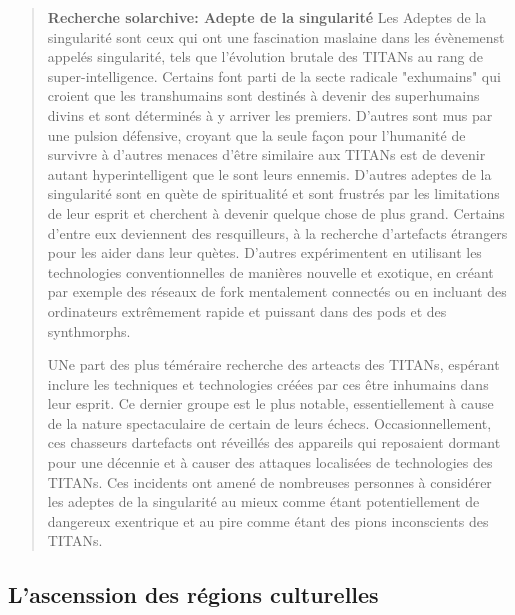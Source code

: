 \begin{quotation} \textbf{Recherche solarchive: Adepte de la singularité } Les Adeptes de la singularité sont ceux qui ont une fascination maslaine dans les évènemenst appelés singularité, tels que l'évolution brutale des TITANs au rang de super-intelligence. Certains font parti de la secte radicale  "exhumains" qui croient que les transhumains sont destinés à devenir des superhumains divins et sont déterminés à y arriver les premiers. D'autres sont mus par une pulsion défensive, croyant que la seule façon pour l'humanité de survivre à d'autres menaces  d'être similaire aux TITANs est de devenir autant hyperintelligent que le sont leurs ennemis. D'autres adeptes de la singularité sont en quète de spiritualité et sont frustrés par les limitations de leur esprit et cherchent à devenir quelque chose de plus grand. Certains d'entre eux deviennent des resquilleurs, à la recherche d'artefacts étrangers pour les aider dans leur quètes. D'autres expérimentent en utilisant les technologies conventionnelles de manières nouvelle et exotique, en créant par exemple des réseaux de fork mentalement connectés ou en incluant des ordinateurs extrêmement rapide et puissant dans des pods et des synthmorphs. 

UNe part des plus téméraire recherche des arteacts des TITANs, espérant inclure les techniques et technologies créées par ces être inhumains dans leur esprit. Ce dernier groupe est le plus notable, essentiellement à cause de la nature spectaculaire de certain de leurs échecs. Occasionnellement, ces chasseurs dartefacts ont réveillés des appareils qui reposaient dormant pour une décennie et à causer des attaques localisées de technologies des TITANs. Ces incidents ont amené de nombreuses personnes à considérer les adeptes de la singularité au mieux comme étant potentiellement de dangereux exentrique et au pire comme étant des pions inconscients des TITANs. \end{quotation} 

\subsection{L'ascenssion des régions culturelles} \label{sec:rise-cult-regi} 

